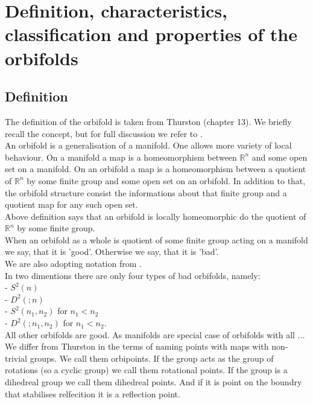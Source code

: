 \chapter{Definition, characteristics, classification and properties of the orbifolds}
\section{Definition}
The definition of the orbifold is taken from Thurston \cite{Thurston1979} (chapter 13). 
We briefly recall the concept, but for full discussion we refer to \cite{Thurston1979}. \\
An orbifold is a generalisation of a manifold. One allows more variety of local behaviour. 
On a manifold a map is a homeomorphism between $\mathbb{R}^n$ and some open set on a manifold. 
On an orbifold a map is a homeomorphism between a quotient of $\mathbb{R}^n$ by some 
finite group and some open set on an orbifold. 
In addition to that, the orbifold structure consist the informations about that finite group 
and a quotient map for any such open set. \\

Above definition says that an orbifold is locally homeomorphic do the quotient of $\mathbb{R}^n$ 
by some finite group. \\
When an orbifold as a whole is quotient of some finite group acting on a manifold we say, that 
it is 'good'. Otherwise we say, that it is 'bad'. \\

We are also adopting notation from \cite{Thurston1979}. \\

In two dimentions there are only four types of bad orbifolds, namely: \\
- $S^2(n)$ \\
- $D^2(;n)$ \\
- $S^2(n_1,n_2)$ for $n_1 < n_2$ \\
- $D^2(;n_1,n_2)$ for $n_1 < n_2$. \\
All other orbifolds are good.
As manifolds are special case of orbifolds with all ...
We differ from Thurston in the terms of naming points with maps with non-trivial groups. 
We call them orbipoints. If the group acts as the group of rotations (so a 
cyclic group) we call them rotational points. If the group is a dihedreal group we call them 
dihedreal points. And if it is point on the boundry that stabilises relfecition it is a 
reflection point.

